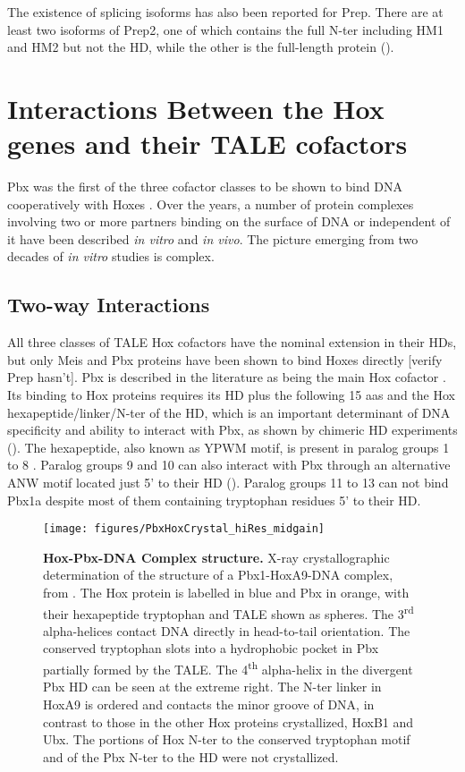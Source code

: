 The existence of splicing isoforms has also been reported for Prep. There are at least two isoforms of Prep2, one of which contains the full \ac{N-ter} including HM1 and HM2 but not the \ac{HD}, while the other is the full-length protein (\cite{Haller2004}).

\section{Interactions Between the Hox genes and their TALE cofactors}
\label{sec:interactions}

Pbx was the first of the three cofactor classes to be shown to bind DNA cooperatively with Hoxes \cite{Chan1994}. Over the years, a number of protein complexes involving two or more partners binding on the surface of DNA or independent of it have been described \textit{in vitro} and \textit{in vivo}. The picture emerging from two decades of \textit{in vitro} studies is complex. 

\subsection{Two-way Interactions}

All three classes of \ac{TALE} Hox cofactors have the nominal extension in their \acp{HD}, but only Meis and Pbx proteins have been shown to bind Hoxes directly [verify Prep hasn't]. Pbx is described in the literature as being the main Hox cofactor \cite{ref}. Its binding to Hox proteins requires its \ac{HD} plus the following 15 \acp{aa} and the Hox hexapeptide/linker/\ac{N-ter} of the \ac{HD}, which is an important determinant of DNA specificity and ability to interact with Pbx, as shown by chimeric \ac{HD} experiments (\cite{Chang1996, Phelan1997}). The hexapeptide, also known as YPWM motif, is present in paralog groups 1 to 8 \cite{Chang1995, Passner1999}. Paralog groups 9 and 10 can also interact with Pbx through an alternative ANW motif located just 5' to their \ac{HD} (\cite{Chang1996, Shen1997a}). Paralog groups 11 to 13 can not bind Pbx1a despite most of them containing tryptophan residues 5' to their \ac{HD}. 

\begin{figure}[]
  \centering
  \texttt{[image: figures/PbxHoxCrystal\_hiRes\_midgain]}
  \caption[Hox-Pbx-DNA Complex structure]{\textbf{Hox-Pbx-DNA Complex structure.} X-ray crystallographic determination of the structure of a Pbx1-HoxA9-DNA complex, from \cite{LaRonde-LeBlanc2003}. The Hox protein is labelled in blue and Pbx in orange, with their hexapeptide tryptophan and \ac{TALE} shown as spheres. The 3\textsuperscript{rd} alpha-helices contact DNA directly in head-to-tail orientation. The conserved tryptophan slots into a hydrophobic pocket in Pbx partially formed by the \ac{TALE}. The 4\textsuperscript{th} alpha-helix in the divergent Pbx \ac{HD} can be seen at the extreme right. The \ac{N-ter} linker in HoxA9 is ordered and contacts the minor groove of DNA, in contrast to those in the other Hox proteins crystallized, HoxB1 and Ubx. The portions of Hox \ac{N-ter} to the conserved tryptophan motif and of the Pbx \ac{N-ter} to the \ac{HD} were not crystallized.}
  \label{fig:PbxHoxCrystal}
\end{figure}

